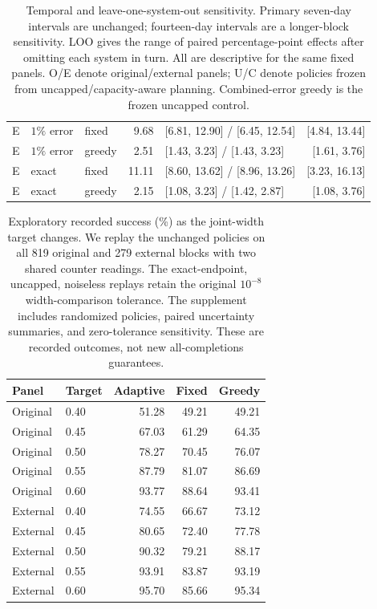 \begin{table}[htbp]
\begin{tabular}{lllrlr}
E & $1\%$ error & fixed & 9.68 & [6.81, 12.90] / [6.45, 12.54] & [4.84, 13.44]\\
E & $1\%$ error & greedy & 2.51 & [1.43, 3.23] / [1.43, 3.23] & [1.61, 3.76]\\
E & exact & fixed & 11.11 & [8.60, 13.62] / [8.96, 13.26] & [3.23, 16.13]\\
E & exact & greedy & 2.15 & [1.08, 3.23] / [1.42, 2.87] & [1.08, 3.76]\\
\bottomrule
\end{tabular}
\caption{Temporal and leave-one-system-out sensitivity. Primary seven-day intervals are unchanged; fourteen-day intervals are a longer-block sensitivity. LOO gives the range of paired percentage-point effects after omitting each system in turn. All are descriptive for the same fixed panels. O/E denote original/external panels; U/C denote policies frozen from uncapped/capacity-aware planning. Combined-error greedy is the frozen uncapped control.}
\label{tab:joint_long_dependence}
\end{table}
\begin{table}[htbp]
\centering\small
\begin{tabular}{llrrr}
\toprule
Panel & Target & Adaptive & Fixed & Greedy\\
\midrule
Original & 0.40 & 51.28 & 49.21 & 49.21\\
Original & 0.45 & 67.03 & 61.29 & 64.35\\
Original & 0.50 & 78.27 & 70.45 & 76.07\\
Original & 0.55 & 87.79 & 81.07 & 86.69\\
Original & 0.60 & 93.77 & 88.64 & 93.41\\
External & 0.40 & 74.55 & 66.67 & 73.12\\
External & 0.45 & 80.65 & 72.40 & 77.78\\
External & 0.50 & 90.32 & 79.21 & 88.17\\
External & 0.55 & 93.91 & 83.87 & 93.19\\
External & 0.60 & 95.70 & 85.66 & 95.34\\
\bottomrule
\end{tabular}
\caption{Exploratory recorded success (\%) as the joint-width target changes. We replay the unchanged policies on all 819 original and 279 external blocks with two shared counter readings. The exact-endpoint, uncapped, noiseless replays retain the original $10^{-8}$ width-comparison tolerance. The supplement includes randomized policies, paired uncertainty summaries, and zero-tolerance sensitivity. These are recorded outcomes, not new all-completions guarantees.}
\label{tab:joint_threshold_sensitivity}
\end{table}
